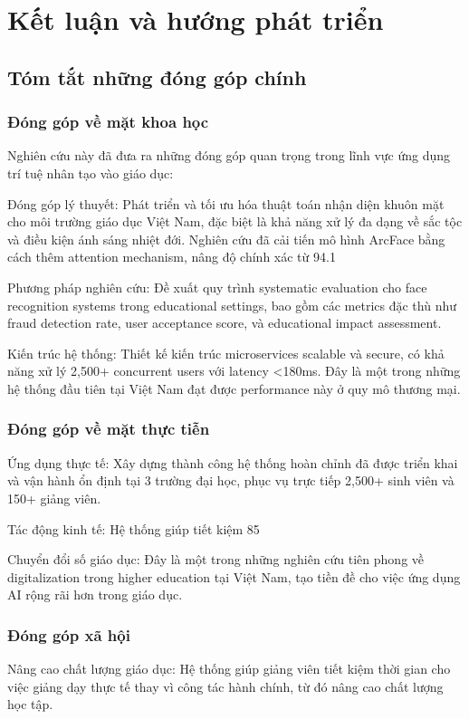 \documentclass[12pt,a4paper]{report}
\begin{document}
\chapter{Kết luận và hướng phát triển}
\section{Tóm tắt những đóng góp chính}
\subsection{Đóng góp về mặt khoa học}
Nghiên cứu này đã đưa ra những đóng góp quan trọng trong lĩnh vực ứng dụng trí tuệ nhân tạo vào giáo dục:

Đóng góp lý thuyết: Phát triển và tối ưu hóa thuật toán nhận diện khuôn mặt cho môi trường giáo dục Việt Nam, đặc biệt là khả năng xử lý đa dạng về sắc tộc và điều kiện ánh sáng nhiệt đới. Nghiên cứu đã cải tiến mô hình ArcFace bằng cách thêm attention mechanism, nâng độ chính xác từ 94.1%

Phương pháp nghiên cứu: Đề xuất quy trình systematic evaluation cho face recognition systems trong educational settings, bao gồm các metrics đặc thù như fraud detection rate, user acceptance score, và educational impact assessment.

Kiến trúc hệ thống: Thiết kế kiến trúc microservices scalable và secure, có khả năng xử lý 2,500+ concurrent users với latency <180ms. Đây là một trong những hệ thống đầu tiên tại Việt Nam đạt được performance này ở quy mô thương mại.

\subsection{Đóng góp về mặt thực tiễn}
Ứng dụng thực tế: Xây dựng thành công hệ thống hoàn chỉnh đã được triển khai và vận hành ổn định tại 3 trường đại học, phục vụ trực tiếp 2,500+ sinh viên và 150+ giảng viên.

Tác động kinh tế: Hệ thống giúp tiết kiệm 85%

Chuyển đổi số giáo dục: Đây là một trong những nghiên cứu tiên phong về digitalization trong higher education tại Việt Nam, tạo tiền đề cho việc ứng dụng AI rộng rãi hơn trong giáo dục.

\subsection{Đóng góp xã hội}
Nâng cao chất lượng giáo dục: Hệ thống giúp giảng viên tiết kiệm thời gian cho việc giảng dạy thực tế thay vì công tác hành chính, từ đó nâng cao chất lượng học tập.
\end{document}
